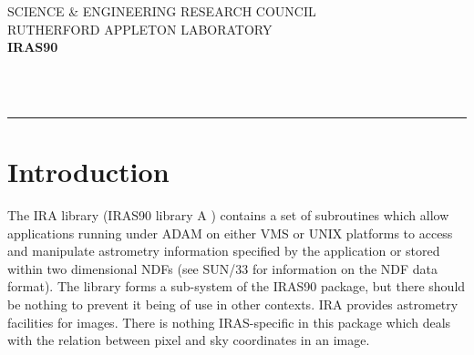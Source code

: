 

\thispagestyle{empty}
SCIENCE \& ENGINEERING RESEARCH COUNCIL \hfill \irasdocname\\
RUTHERFORD APPLETON LABORATORY\\
{\large\bf IRAS90\\}
{\large\bf \irasdoccategory\ \irasdocnumber}
\begin{flushright}
\irasdocauthors\\
\irasdocdate
\end{flushright}
\vspace{-4mm}
\rule{\textwidth}{0.5mm}
\vspace{5mm}
\begin{center}
{\Large\bf \irasdoctitle}
\end{center}
\vspace{5mm}
\setlength{\parskip}{0mm}
\tableofcontents
\setlength{\parskip}{\medskipamount}
\markright{\irasdocname}

\section {Introduction}
The IRA library (IRAS90 library A ) contains a set of subroutines which allow
applications running under ADAM on either VMS or UNIX platforms to access and
manipulate astrometry information specified by the application or stored within
two dimensional NDFs (see SUN/33 for information on the NDF data format). The
library forms a sub-system of the IRAS90 package, but there should be nothing to
prevent it being of use in other contexts. IRA provides astrometry facilities
for images. There is nothing IRAS-specific in this package which deals with the
relation between pixel and sky coordinates in an image. 

